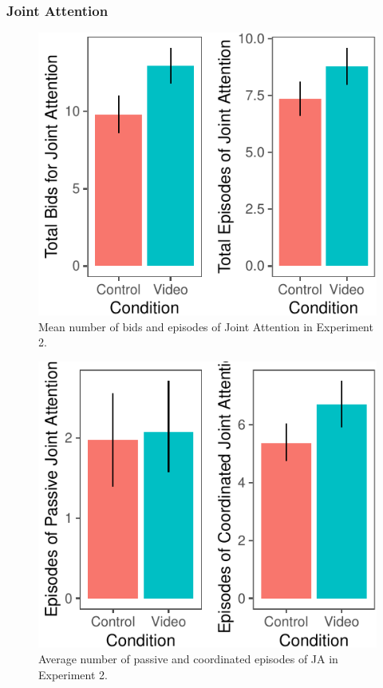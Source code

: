 \documentclass[]{article}
\begin{document}
\hypertarget{joint-attention-1}{%
\subsubsection{Joint Attention}\label{joint-attention-1}}

\begin{figure}[H]

{\centering \includegraphics{figs/e2ja-graphs-1} 

}

\caption{Mean number of bids and episodes of Joint Attention in Experiment 2.}\label{fig:e2ja-graphs}
\end{figure}

\begin{figure}[H]

{\centering \includegraphics{figs/e2ja-graphs-pass-coord-1} 

}

\caption{Average number of passive and coordinated episodes of JA in Experiment 2.}\label{fig:e2ja-graphs-pass-coord}
\end{figure}
\end{document}
